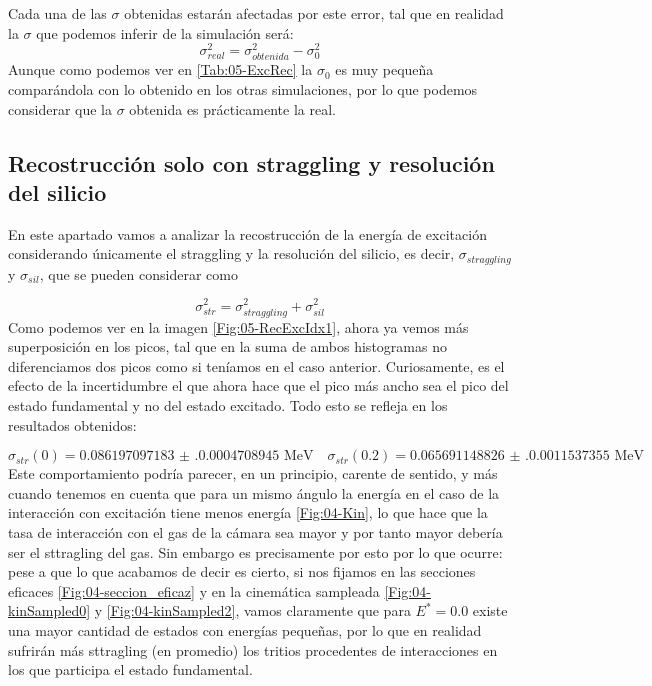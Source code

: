 Cada una de las $\sigma$ obtenidas estarán afectadas por este error, tal que en realidad la $\sigma$ que podemos inferir de la simulación será:
\begin{equation}
    \sigma_{real}^2 = \sigma_{obtenida}^2 - \sigma_{0}^2
\end{equation}
Aunque como podemos ver en  \cref{Tab:05-ExcRec} la $\sigma_{0}$ es muy pequeña comparándola con lo obtenido en los otras simulaciones, por lo que podemos considerar que la $\sigma$ obtenida es prácticamente la real. 



\subsection{Recostrucción solo con straggling y resolución del silicio}

En este apartado vamos a analizar la recostrucción de la energía de excitación considerando únicamente el straggling y la resolución del silicio, es decir, $\sigma_{straggling}$ y $\sigma_{sil}$, que se pueden considerar como

\begin{equation}
    \sigma_{str}^2 = \sigma_{straggling}^2 + \sigma_{sil}^2
\end{equation}
Como podemos ver en la imagen \cref{Fig:05-RecExcIdx1}, ahora ya vemos más superposición en los picos, tal que en la suma de ambos histogramas no diferenciamos dos picos como si teníamos en el caso anterior. Curiosamente, es el efecto de la incertidumbre el que ahora hace que el pico más ancho sea el pico del estado fundamental y no del estado excitado. Todo esto se refleja en los resultados obtenidos: 

\begin{equation}
    \sigma_{str} (0) = \num{0.086197097183(0.0004708945)} \text{ MeV} \quad 
    \sigma_{str} (0.2) = \num{0.065691148826(0.0011537355)} \text{ MeV}
\end{equation} 
Este comportamiento podría parecer, en un principio, carente de sentido, y más cuando tenemos en cuenta que para un mismo ángulo la energía en el caso de la interacción con excitación tiene menos energía \cref{Fig:04-Kin}, lo que hace que la tasa de interacción con el gas de la cámara sea mayor y por tanto mayor debería ser el sttragling del gas. Sin embargo es precisamente por esto por lo que ocurre: pese a que lo que acabamos de decir es cierto, si nos fijamos en las secciones eficaces \cref{Fig:04-seccion_eficaz} y en la cinemática sampleada \cref{Fig:04-kinSampled0} y \cref{Fig:04-kinSampled2}, vamos claramente que para $E^*=0.0$ existe una mayor cantidad de estados con energías pequeñas, por lo que en realidad sufrirán más sttragling (en promedio) los tritios procedentes de interacciones en los que participa el estado fundamental. 


